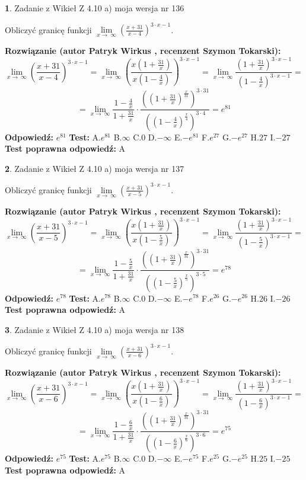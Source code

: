\documentclass[12pt, a4paper]{article}
\theoremstyle{definition} %
\newtheorem{zad}{}
\newcommand{\zadStart}[1]{\begin{zad}#1\newline}
\newcommand{\zadStop}{\end{zad}}
\newcommand{\rozwStart}[2]{\noindent \textbf{Rozwiązanie (autor #1 , recenzent #2): }\newline}
\newcommand{\rozwStop}{\newline}
\newcommand{\odpStart}{\noindent \textbf{Odpowiedź:}\newline}
\newcommand{\odpStop}{\newline}
\newcommand{\testStart}{\noindent \textbf{Test:}\newline}
\newcommand{\testStop}{\newline}
\newcommand{\kluczStart}{\noindent \textbf{Test poprawna odpowiedź:}\newline}
\newcommand{\kluczStop}{\newline}
\begin{document}
\zadStart{Zadanie z Wikieł Z 4.10 a) moja wersja nr 136}

Obliczyć granicę funkcji  $\lim\limits_{x\to\ \infty}(\frac{x+31}{x-4})^{3\cdot x-1}$.
\zadStop
\rozwStart{Patryk Wirkus}{Szymon Tokarski}
$$\lim\limits_{x\to\ \infty}(\frac{x+31}{x-4})^{3\cdot x-1} = \lim\limits_{x\to\ \infty}(\frac{x(1+\frac{31}{x})}{x(1-\frac{4}{x})})^{3\cdot x-1}=\lim\limits_{x\to\ \infty}\frac{(1+\frac{31}{x})^{3\cdot x-1}}{(1-\frac{4}{x})^{3\cdot x-1}}=$$
$$=\lim\limits_{x\to\ \infty}\frac{1-\frac{4}{x}}{1+\frac{31}{x}}\cdot\frac{((1+\frac{31}{x})^{\frac{x}{31}})^{3\cdot31}}{((1-\frac{4}{x})^{\frac{x}{4}})^{3\cdot4}}=e^{81}$$
\rozwStop
\odpStart
$e^{81}$
\odpStop
\testStart
A.$e^{81}$ B.$\infty$ C.$0$ D.$-\infty$ E.$-e^{81}$
F.$e^{27}$ G.$-e^{27}$
H.$27$
I.$-27$
\testStop
\kluczStart
A
\kluczStop



\zadStart{Zadanie z Wikieł Z 4.10 a) moja wersja nr 137}

Obliczyć granicę funkcji  $\lim\limits_{x\to\ \infty}(\frac{x+31}{x-5})^{3\cdot x-1}$.
\zadStop
\rozwStart{Patryk Wirkus}{Szymon Tokarski}
$$\lim\limits_{x\to\ \infty}(\frac{x+31}{x-5})^{3\cdot x-1} = \lim\limits_{x\to\ \infty}(\frac{x(1+\frac{31}{x})}{x(1-\frac{5}{x})})^{3\cdot x-1}=\lim\limits_{x\to\ \infty}\frac{(1+\frac{31}{x})^{3\cdot x-1}}{(1-\frac{5}{x})^{3\cdot x-1}}=$$
$$=\lim\limits_{x\to\ \infty}\frac{1-\frac{5}{x}}{1+\frac{31}{x}}\cdot\frac{((1+\frac{31}{x})^{\frac{x}{31}})^{3\cdot31}}{((1-\frac{5}{x})^{\frac{x}{5}})^{3\cdot5}}=e^{78}$$
\rozwStop
\odpStart
$e^{78}$
\odpStop
\testStart
A.$e^{78}$ B.$\infty$ C.$0$ D.$-\infty$ E.$-e^{78}$
F.$e^{26}$ G.$-e^{26}$
H.$26$
I.$-26$
\testStop
\kluczStart
A
\kluczStop



\zadStart{Zadanie z Wikieł Z 4.10 a) moja wersja nr 138}

Obliczyć granicę funkcji  $\lim\limits_{x\to\ \infty}(\frac{x+31}{x-6})^{3\cdot x-1}$.
\zadStop
\rozwStart{Patryk Wirkus}{Szymon Tokarski}
$$\lim\limits_{x\to\ \infty}(\frac{x+31}{x-6})^{3\cdot x-1} = \lim\limits_{x\to\ \infty}(\frac{x(1+\frac{31}{x})}{x(1-\frac{6}{x})})^{3\cdot x-1}=\lim\limits_{x\to\ \infty}\frac{(1+\frac{31}{x})^{3\cdot x-1}}{(1-\frac{6}{x})^{3\cdot x-1}}=$$
$$=\lim\limits_{x\to\ \infty}\frac{1-\frac{6}{x}}{1+\frac{31}{x}}\cdot\frac{((1+\frac{31}{x})^{\frac{x}{31}})^{3\cdot31}}{((1-\frac{6}{x})^{\frac{x}{6}})^{3\cdot6}}=e^{75}$$
\rozwStop
\odpStart
$e^{75}$
\odpStop
\testStart
A.$e^{75}$ B.$\infty$ C.$0$ D.$-\infty$ E.$-e^{75}$
F.$e^{25}$ G.$-e^{25}$
H.$25$
I.$-25$
\testStop
\kluczStart
A
\kluczStop
\end{document}
